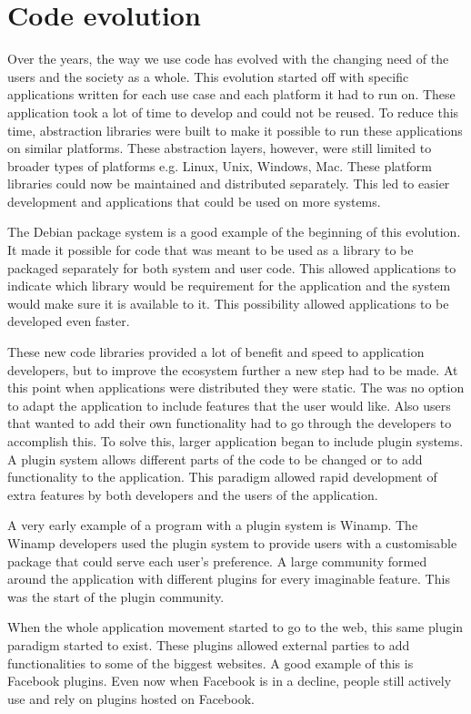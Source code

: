 \section{Code evolution}
Over the years, the way we use code has evolved with the changing need of the users and the society as a whole. This evolution started off with specific applications written for each use case and each platform it had to run on. These application took a lot of time to develop and could not be reused. To reduce this time, abstraction libraries were built to make it possible to run these applications on similar platforms. These abstraction layers, however, were still limited to broader types of platforms e.g. Linux, Unix, Windows, Mac. These platform libraries could now be maintained and distributed separately. This led to easier development and applications that could be used on more systems.

The Debian package system is a good example of the beginning of this evolution. It made it possible for code that was meant to be used as a library to be packaged separately for both system and user code. This allowed applications to indicate which library would be requirement for the application and the system would make sure it is available to it. This possibility allowed applications to be developed even faster.

These new code libraries provided a lot of benefit and speed to application developers, but to improve the ecosystem further a new step had to be made. At this point when applications were distributed they were static. The was no option to adapt the application to include features that the user would like. Also users that wanted to add their own functionality had to go through the developers to accomplish this. To solve this, larger application began to include plugin systems. A plugin system allows different parts of the code to be changed or to add functionality to the application. This paradigm allowed rapid development of extra features by both developers and the users of the application.

A very early example of a program with a plugin system is Winamp. The Winamp developers used the plugin system to provide users with a customisable package that could serve each user's preference. A large community formed around the application with different plugins for every imaginable feature. This was the start of the plugin community.

When the whole application movement started to go to the web, this same plugin paradigm started to exist. These plugins allowed external parties to add functionalities to some of the biggest websites. A good example of this is Facebook plugins. Even now when Facebook is in a decline, people still actively use and rely on plugins hosted on Facebook.

